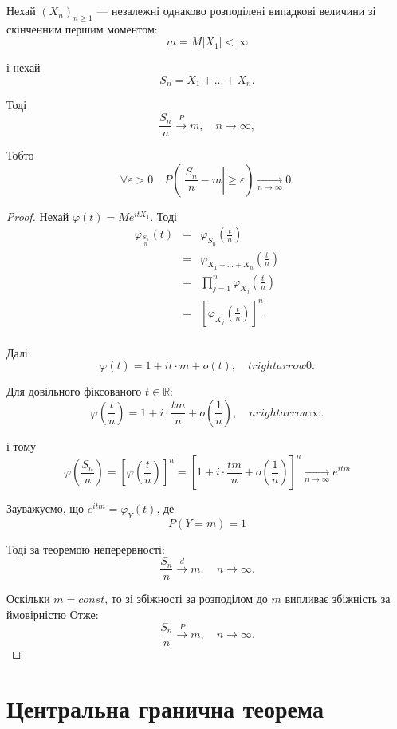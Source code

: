 \begin{theorem}[ЗВУ]
    Нехай $(X_n)_{n \geqslant 1}$ --- незалежні однаково
    розподілені випадкові величини
    зі скінченним першим моментом:
    $$m = M|X_1| < \infty$$

    і нехай
    $$S_n = X_1 + ... + X_n.$$
    
    Тоді
    $$\dfrac{S_n}{n} \xrightarrow{P} m, \quad n \rightarrow \infty,$$

    Тобто
    $$\forall \varepsilon > 0 \quad P(|\dfrac{S_n}{n} - m| \geqslant \varepsilon) \xrightarrow[n \rightarrow \infty]{} 0.$$
\end{theorem}
\begin{proof}
    Нехай $\varphi(t) = Me^{itX_1}$.
    Тоді
    $$\begin{array}{rcl}
        \varphi_{\frac{S_n}{n}}(t)
        & = & \varphi_{S_n}(\frac{t}{n}) \\
        & = & \varphi_{X_1 + ... + X_n}(\frac{t}{n}) \\
        & = & \prod\limits_{j=1}^{n} \varphi_{X_j}(\frac{t}{n}) \\
        & = & \left[ \varphi_{X_j}(\frac{t}{n}) \right]^n. \\
    \end{array}$$

    Далі: 
    $$\varphi(t) = 1 + it \cdot m + o(t), \quad t rightarrow 0.$$

    Для довільного фіксованого $t \in \mathbb{R}$:
    $$\varphi(\frac{t}{n}) = 1 + i \cdot \frac{tm}{n} + o(\frac{1}{n}), \quad n rightarrow \infty.$$
    
    і тому
    $$\varphi(\frac{S_n}{n})
    = \left[ \varphi(\frac{t}{n}) \right]^n
    = \left[1 + i \cdot \frac{tm}{n} + o(\frac{1}{n}) \right]^n \xrightarrow[n \rightarrow \infty]{} e^{itm}$$

    Зауважуємо, що $e^{itm} = \varphi_{Y}(t)$, де
    $$P(Y = m) = 1$$

    Тоді за теоремою неперервності:
    $$\dfrac{S_n}{n} \xrightarrow{d} m, \quad n \rightarrow \infty.$$
    
    Оскільки $m = const$, то зі збіжності за розподілом
    до $m$ випливає збіжність за ймовірністю
    Отже:
    $$\dfrac{S_n}{n} \xrightarrow{P} m, \quad n \rightarrow \infty.$$
\end{proof}
 
\section{Центральна гранична теорема}

